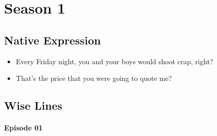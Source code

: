 \section{Season 1}

\subsection*{Native Expression}
\begin{itemize}
    \item \textsf{Every Friday night, you and your boys would shoot crap, right?}
    \item \textsf{That's the price that you were going to quote me?}
\end{itemize}

\subsection*{Wise Lines}
\paragraph*{Episode 01}

